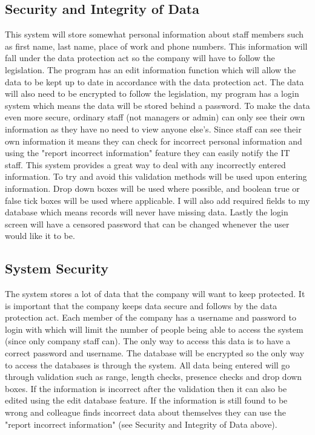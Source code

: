\subsection{Security and Integrity of Data}

This system will store somewhat personal information about staff members such as first name, last name, place of work and phone numbers. This information will fall under the data protection act so the company will have to follow the legislation. The program has an edit information function which will allow the data to be kept up to date in accordance with the data protection act. The data will also need to be encrypted to follow the legislation, my program has a login system which means the data will be stored behind a password. To make the data even more secure, ordinary staff (not managers or admin) can only see their own information as they have no need to view anyone else's. Since staff can see their own information it means they can check for incorrect personal information and using the "report incorrect information" feature they can easily notify the IT staff. This system provides a great way to deal with any incorrectly entered information. To try and avoid this validation methods will be used upon entering information. Drop down boxes will be used where possible, and boolean true or false tick boxes will be used where applicable. I will also add required fields to my database which means records will never have missing data. Lastly the login screen will have a censored password that can be changed whenever the user would like it to be.

\subsection{System Security}

The system stores a lot of data that the company will want to keep protected. It is important that the company keeps data secure and follows by the data protection act. Each member of the company has a username and password to login with which will limit the number of people being able to access the system (since only company staff can). The only way to access this data is to have a correct password and username. The database will be encrypted so the only way to access the databases is through the system. All data being entered will go through validation such as range, length checks, presence checks and drop down boxes. If the information is incorrect after the validation then it can also be edited using the edit database feature. If the information is still found to be wrong and colleague finds incorrect data about themselves they can use the "report incorrect information" (see Security and Integrity of Data above).

